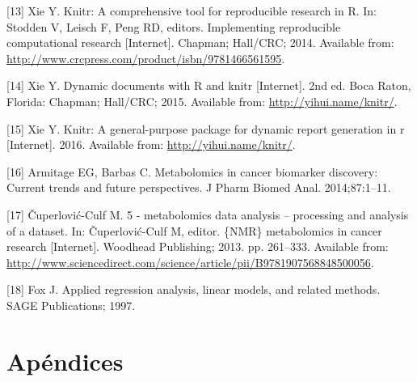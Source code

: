 \documentclass[12pt,spanish,a4paper]{article}
\numberwithin{equation}{section}
\begin{document}
\hypertarget{ref-xie2014}{}
{[}13{]} Xie Y. Knitr: A comprehensive tool for reproducible research in
R. In: Stodden V, Leisch F, Peng RD, editors. Implementing reproducible
computational research {[}Internet{]}. Chapman; Hall/CRC; 2014.
Available from:
\url{http://www.crcpress.com/product/isbn/9781466561595}.

\hypertarget{ref-xie2015}{}
{[}14{]} Xie Y. Dynamic documents with R and knitr {[}Internet{]}. 2nd
ed. Boca Raton, Florida: Chapman; Hall/CRC; 2015. Available from:
\url{http://yihui.name/knitr/}.

\hypertarget{ref-xie2016package}{}
{[}15{]} Xie Y. Knitr: A general-purpose package for dynamic report
generation in r {[}Internet{]}. 2016. Available from:
\url{http://yihui.name/knitr/}.

\hypertarget{ref-armitage2014}{}
{[}16{]} Armitage EG, Barbas C. Metabolomics in cancer biomarker
discovery: Current trends and future perspectives. J Pharm Biomed Anal.
2014;87:1--11.

\hypertarget{ref-miroslava2013}{}
{[}17{]} Čuperlović-Culf M. 5 - metabolomics data analysis -- processing
and analysis of a dataset. In: Čuperlović-Culf M, editor. \{NMR\}
metabolomics in cancer research {[}Internet{]}. Woodhead Publishing;
2013. pp. 261--333. Available from:
\url{http://www.sciencedirect.com/science/article/pii/B9781907568848500056}.

\hypertarget{ref-fox1997}{}
{[}18{]} Fox J. Applied regression analysis, linear models, and related
methods. SAGE Publications; 1997.

% 
%

\clearpage

\section{Apéndices}






\end{document}
